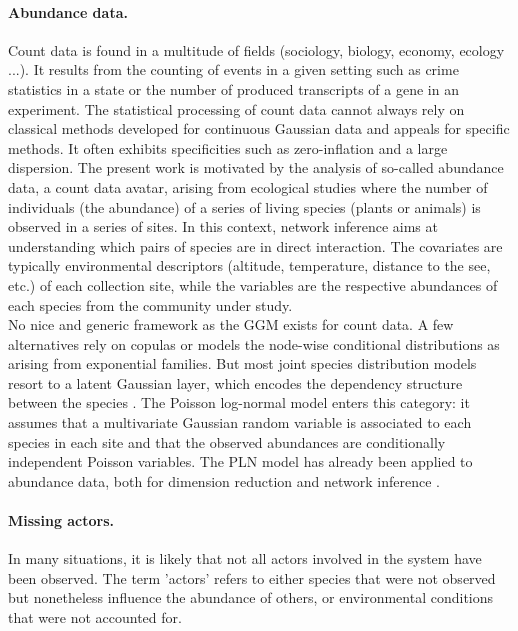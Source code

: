 \paragraph{Abundance data.}
{Count data is found in a multitude of fields (sociology, biology, economy, ecology ...). It results from the counting of events in a given setting such as crime statistics in a state or the number of produced transcripts of a gene in an experiment. The statistical processing of count data cannot always rely on  classical methods developed for continuous Gaussian data and appeals for specific methods. It often exhibits specificities such as zero-inflation and a large dispersion. The present work is motivated by the analysis of so-called abundance data, a count data avatar,  arising from ecological studies where the number of individuals (the abundance) of a series of living species (plants or animals) is observed in a series of sites.} 
In this context, network inference aims at understanding which pairs of species are in direct interaction. The covariates are typically environmental descriptors (altitude, temperature, distance to the see, etc.) of each collection site, while the variables are the respective abundances of each species from the community under study. \\
No nice and generic framework as the GGM exists for count data. A few alternatives rely on copulas  \citep{inouye} or models the node-wise conditional distributions as arising from exponential families. But most joint species distribution models resort to a latent Gaussian layer, which encodes the dependency structure between the species \citep{WBO15,PHW18,PWT19}. The Poisson log-normal model \citep[PLN:][]{AiH89} enters this category: it assumes that a multivariate Gaussian random variable is associated to each species in each site and that the observed abundances are conditionally independent Poisson variables. The PLN model has already been applied to abundance data, both for dimension reduction \citep{CMR18} and network inference \citep{CMR19,MRA20}.

\paragraph{Missing actors.}
In many situations, it is likely that not all actors involved in the system have been observed. The term 'actors' refers to either species that were not observed but nonetheless influence the abundance of others, or environmental conditions that were not accounted for. 

